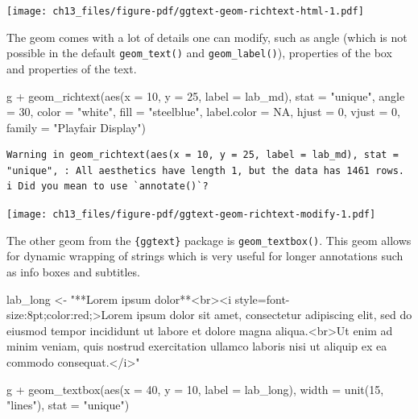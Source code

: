 \documentclass[
  letterpaper,
  DIV=11,
  numbers=noendperiod]{scrreprt}
\newenvironment{Shaded}{\begin{snugshade}}{\end{snugshade}}
\newcommand{\AttributeTok}[1]{\textcolor[rgb]{0.40,0.45,0.13}{#1}}
\newcommand{\ConstantTok}[1]{\textcolor[rgb]{0.56,0.35,0.01}{#1}}
\newcommand{\DecValTok}[1]{\textcolor[rgb]{0.68,0.00,0.00}{#1}}
\newcommand{\FunctionTok}[1]{\textcolor[rgb]{0.28,0.35,0.67}{#1}}
\newcommand{\NormalTok}[1]{\textcolor[rgb]{0.00,0.23,0.31}{#1}}
\newcommand{\OtherTok}[1]{\textcolor[rgb]{0.00,0.23,0.31}{#1}}
\newcommand{\SpecialCharTok}[1]{\textcolor[rgb]{0.37,0.37,0.37}{#1}}
\newcommand{\StringTok}[1]{\textcolor[rgb]{0.13,0.47,0.30}{#1}}
\begin{document}
\texttt{[image: ch13\_files/figure-pdf/ggtext-geom-richtext-html-1.pdf]}

The geom comes with a lot of details one can modify, such as angle
(which is not possible in the default \texttt{geom\_text()} and
\texttt{geom\_label()}), properties of the box and properties of the
text.

\begin{Shaded}
\begin{Highlighting}[]
\NormalTok{g }\SpecialCharTok{+}
  \FunctionTok{geom\_richtext}\NormalTok{(}\FunctionTok{aes}\NormalTok{(}\AttributeTok{x =} \DecValTok{10}\NormalTok{, }\AttributeTok{y =} \DecValTok{25}\NormalTok{, }\AttributeTok{label =}\NormalTok{ lab\_md),}
                \AttributeTok{stat =} \StringTok{"unique"}\NormalTok{, }\AttributeTok{angle =} \DecValTok{30}\NormalTok{,}
                \AttributeTok{color =} \StringTok{"white"}\NormalTok{, }\AttributeTok{fill =} \StringTok{"steelblue"}\NormalTok{,}
                \AttributeTok{label.color =} \ConstantTok{NA}\NormalTok{, }\AttributeTok{hjust =} \DecValTok{0}\NormalTok{, }\AttributeTok{vjust =} \DecValTok{0}\NormalTok{,}
                \AttributeTok{family =} \StringTok{"Playfair Display"}\NormalTok{)}
\end{Highlighting}
\end{Shaded}

\begin{verbatim}
Warning in geom_richtext(aes(x = 10, y = 25, label = lab_md), stat = "unique", : All aesthetics have length 1, but the data has 1461 rows.
i Did you mean to use `annotate()`?
\end{verbatim}

\texttt{[image: ch13\_files/figure-pdf/ggtext-geom-richtext-modify-1.pdf]}

The other geom from the \texttt{\{ggtext\}} package is
\texttt{geom\_textbox()}. This geom allows for dynamic wrapping of
strings which is very useful for longer annotations such as info boxes
and subtitles.

\begin{Shaded}
\begin{Highlighting}[]
\NormalTok{lab\_long }\OtherTok{\textless{}{-}} \StringTok{"**Lorem ipsum dolor**\textless{}br\textgreater{}\textless{}i style=\textquotesingle{}font{-}size:8pt;color:red;\textquotesingle{}\textgreater{}Lorem ipsum dolor sit amet, consectetur adipiscing elit, sed do eiusmod tempor incididunt ut labore et dolore magna aliqua.\textless{}br\textgreater{}Ut enim ad minim veniam, quis nostrud exercitation ullamco laboris nisi ut aliquip ex ea commodo consequat.\textless{}/i\textgreater{}"}

\NormalTok{g }\SpecialCharTok{+}
  \FunctionTok{geom\_textbox}\NormalTok{(}\FunctionTok{aes}\NormalTok{(}\AttributeTok{x =} \DecValTok{40}\NormalTok{, }\AttributeTok{y =} \DecValTok{10}\NormalTok{, }\AttributeTok{label =}\NormalTok{ lab\_long),}
               \AttributeTok{width =} \FunctionTok{unit}\NormalTok{(}\DecValTok{15}\NormalTok{, }\StringTok{"lines"}\NormalTok{), }\AttributeTok{stat =} \StringTok{"unique"}\NormalTok{)}
\end{Highlighting}
\end{Shaded}
\end{document}
